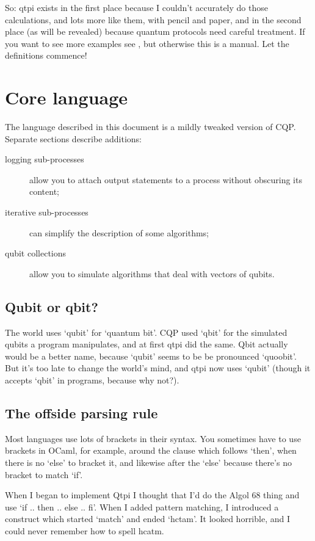 \documentclass[11pt,a4paper]{article}
\begin{document}
So: qtpi exists in the first place because I couldn't accurately do those calculations, and lots more like them, with pencil and paper, and in the second place (as will be revealed) because quantum protocols need careful treatment. If you want to see more examples see , but otherwise this is a manual. Let the definitions commence!

\section{Core language}

The language described in this document is a mildly tweaked version of CQP. Separate sections describe additions:  

\begin{description}
\item[logging sub-processes] allow you to attach output statements to a process without obscuring its content;  
\item[iterative sub-processes] can simplify the description of some algorithms;  
\item[qubit collections] allow you to simulate algorithms that deal with vectors of qubits.
\end{description}
 
\subsection{Qubit or qbit?}
The world uses `qubit' for `quantum bit'. CQP used `qbit' for the simulated qubits a program manipulates, and at first qtpi did the same. Qbit actually would be a better name, because `qubit' seems to be be pronounced `quoobit'. But it's too late to change the world's mind, and qtpi now uses `qubit' (though it accepts `qbit' in programs, because why not?).

\subsection{The offside parsing rule}

Most languages use lots of brackets in their syntax. You sometimes have to use brackets in OCaml, for example, around the clause which follows `then', when there is no `else' to bracket it, and likewise after the `else' because there's no bracket to match `if'.

When I began to implement Qtpi I thought that I'd do the Algol 68 thing and use `if .. then .. else .. fi'. When I added pattern matching, I introduced a construct which started `match' and ended `hctam'. It looked horrible, and I could never remember how to spell hcatm.
\end{document}
